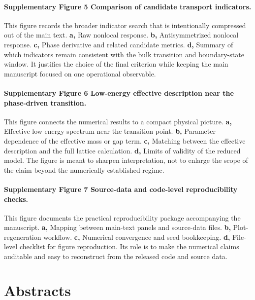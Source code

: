 \paragraph{Supplementary Figure 5 \textbar{} Comparison of candidate transport indicators.}
This figure records the broader indicator search that is intentionally compressed out of the main text. \textbf{a,} Raw nonlocal response. \textbf{b,} Antisymmetrized nonlocal response. \textbf{c,} Phase derivative and related candidate metrics. \textbf{d,} Summary of which indicators remain consistent with the bulk transition and boundary-state window. It justifies the choice of the final criterion while keeping the main manuscript focused on one operational observable.

\paragraph{Supplementary Figure 6 \textbar{} Low-energy effective description near the phase-driven transition.}
This figure connects the numerical results to a compact physical picture. \textbf{a,} Effective low-energy spectrum near the transition point. \textbf{b,} Parameter dependence of the effective mass or gap term. \textbf{c,} Matching between the effective description and the full lattice calculation. \textbf{d,} Limits of validity of the reduced model. The figure is meant to sharpen interpretation, not to enlarge the scope of the claim beyond the numerically established regime.

\paragraph{Supplementary Figure 7 \textbar{} Source-data and code-level reproducibility checks.}
This figure documents the practical reproducibility package accompanying the manuscript. \textbf{a,} Mapping between main-text panels and source-data files. \textbf{b,} Plot-regeneration workflow. \textbf{c,} Numerical convergence and seed bookkeeping. \textbf{d,} File-level checklist for figure reproduction. Its role is to make the numerical claims auditable and easy to reconstruct from the released code and source data.

\section*{Abstracts}

